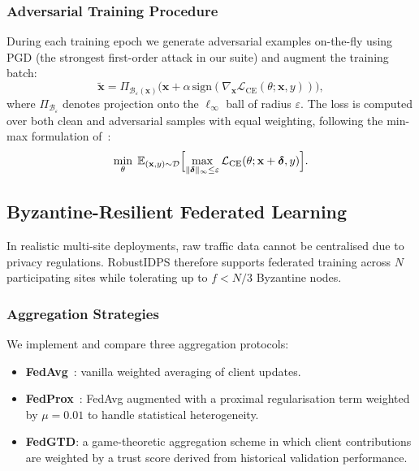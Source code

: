 \subsubsection{Adversarial Training Procedure}
During each training epoch we generate adversarial examples on-the-fly
using PGD (the strongest first-order attack in our suite) and augment
the training batch:
\begin{equation}
  \tilde{\mathbf{x}} = \Pi_{\mathcal{B}_\varepsilon(\mathbf{x})}
  \!\bigl(\mathbf{x} + \alpha\,\mathrm{sign}(
    \nabla_{\mathbf{x}}\mathcal{L}_{\mathrm{CE}}(\theta;\mathbf{x},y)
  )\bigr),
  \label{eq:pgd_step}
\end{equation}
where $\Pi_{\mathcal{B}_\varepsilon}$ denotes projection onto the
$\ell_\infty$ ball of radius $\varepsilon$.  The loss is computed over
both clean and adversarial samples with equal weighting, following the
min-max formulation of~\cite{madry2018towards}:
\begin{equation}
  \min_\theta\;\mathbb{E}_{(\mathbf{x},y)\sim\mathcal{D}}
  \Bigl[\max_{\|\boldsymbol{\delta}\|_\infty\le\varepsilon}
    \mathcal{L}_{\mathrm{CE}}(\theta;\mathbf{x}+\boldsymbol{\delta},y)
  \Bigr].
  \label{eq:adv_train}
\end{equation}

\subsection{Byzantine-Resilient Federated Learning}
\label{sec:federated}

In realistic multi-site deployments, raw traffic data cannot be
centralised due to privacy regulations.  RobustIDPS therefore supports
federated training across $N$ participating sites while tolerating up to
$f<N/3$ Byzantine nodes.

\subsubsection{Aggregation Strategies}
We implement and compare three aggregation protocols:
\begin{itemize}
  \item \textbf{FedAvg}~\cite{mcmahan2017communication}: vanilla
    weighted averaging of client updates.
  \item \textbf{FedProx}~\cite{li2020federated}: FedAvg augmented with
    a proximal regularisation term weighted by $\mu=0.01$ to handle
    statistical heterogeneity.
  \item \textbf{FedGTD}: a game-theoretic aggregation scheme in which
    client contributions are weighted by a trust score derived from
    historical validation performance.
\end{itemize}

